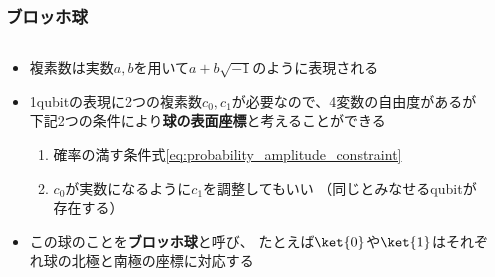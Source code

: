 \begin{frame}
  \frametitle{ブロッホ球}

  \begin{columns}
    \begin{column}{0.6\textwidth}
      \begin{itemize}
        \item<+-> 複素数は実数$a, b$を用いて$a + b\sqrt{-1}$のように表現される
    
        \item<+-> 1qubitの表現に2つの複素数$c_0, c_1$が必要なので、4変数の自由度があるが
        下記2つの条件により\textbf{球の表面座標}と考えることができる
        \begin{enumerate}
          \item 確率の満す条件式\ref{eq:probability_amplitude_constraint}
          \item $c_0$が実数になるように$c_1$を調整してもいい
          （同じとみなせるqubitが存在する）
        \end{enumerate}

        \item<+-> この球のことを\textbf{ブロッホ球}と呼び、
        たとえば$\ket{0}$や$\ket{1}$はそれぞれ球の北極と南極の座標に対応する
      \end{itemize}
    \end{column}
    \begin{column}{0.4\textwidth}
    \end{column}
  \end{columns}
\end{frame}

